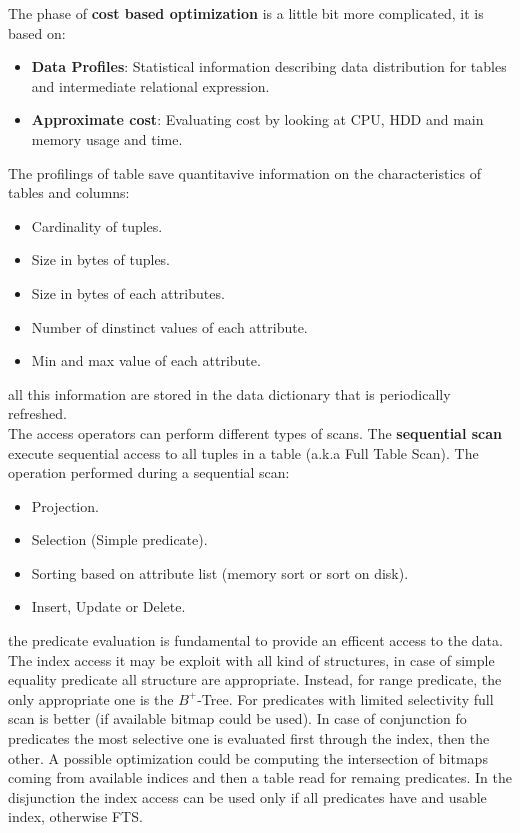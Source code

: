 \documentclass[12pt]{article}
\begin{document}
The phase of \textbf{cost based optimization} is a little bit more complicated, it is based on:
\begin{itemize}
  \item \textbf{Data Profiles}: Statistical information describing data distribution for tables and intermediate relational expression.
  \item \textbf{Approximate cost}: Evaluating cost by looking at CPU, HDD and main memory usage and time.
\end{itemize}
The profilings of table save quantitavive information on the characteristics of tables and columns:
\begin{itemize}
  \item Cardinality of tuples.
  \item Size in bytes of tuples.
  \item Size in bytes of each attributes.
  \item Number of dinstinct values of each attribute.
  \item Min and max value of each attribute.
\end{itemize}
all this information are stored in the data dictionary that is periodically refreshed.\\

The access operators can perform different types of scans. The \textbf{sequential scan} execute sequential access to all tuples in a table (a.k.a Full Table Scan). The operation performed during a sequential scan:
\begin{itemize}
  \item Projection.
  \item Selection (Simple predicate).
  \item Sorting based on attribute list (memory sort or sort on disk).
  \item Insert, Update or Delete.
\end{itemize}
the predicate evaluation is fundamental to provide an efficent access to the data. The index access it may be exploit with all kind of structures, in case of simple equality predicate all structure are appropriate. Instead, for range predicate, the only appropriate one is the $B^{+}$-Tree. For predicates with limited selectivity full scan is better (if available bitmap could be used). In case of conjunction fo predicates the most selective one is evaluated first through the index, then the other. A possible optimization could be computing the intersection of bitmaps coming from available indices and then a table read for remaing predicates. In the disjunction the index access can be used only if all predicates have and usable index, otherwise FTS.\\
\end{document}

